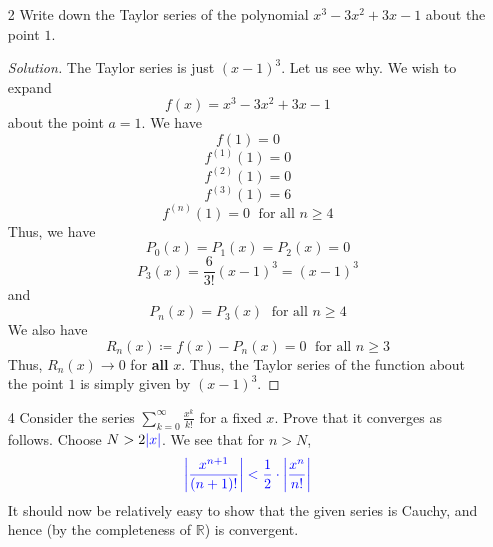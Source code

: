 \documentclass[12pt]{article}
\def\D{\mathrm{d}}
\def\ddfrac#1#2{\displaystyle\frac{\displaystyle #1}{\displaystyle #2}}
\theoremstyle{definition}
\newenvironment{soln}{\begin{proof}[Solution]}{\end{proof}}
\begin{document}
\begin{enumerate}[leftmargin=*]
\begin{soln}
        The remainder term is then just the difference of the arctangent function at $x$ and its Taylor polynomial. More precisely, we have
        \[
            R_n(x) = \arctan(x) - \sum_{k=0}^{M} \frac{(-1)^k}{2k-1} x^{2k-1}
        \]
        with $M$ defined as previously. Let us now calculate the remainder term $R_{2n-1}(x)$ more explicitly. We have
        \[
            \arctan^{\prime} = \textcolor{cyan}{1 - x^2 + x^4 + \ldots + (-1)^{n-1} x^{2n-2}} + (-1)^n x^{2n} \left[1 - x^2 + x^4 - \ldots \right]
        \]
        \[
            \therefore \arctan^{\prime} = \textcolor{cyan}{1 - x^2 + x^4 + (-1)^{n-1} x^{2n-2}} + (-1)^{n} \frac{x^{2n}}{1+x^2}
        \]
        On integrating both sides from $0$ to $x$, the cyan-coloured term just becomes $T_{2n-1}(x)$. (Verify!) Thus, we have
        \[
            \arctan(x) = T_{2n-1}(x) + (-1)^n \int_{0}^{x} \frac{t^{2n}}{1+t^2} \, \D t
        \]
        Thus, 
        \[
            R_{2n-1}(x) = (-1)^n \int_{0}^{x} \frac{t^{2n}}{1+t^2} \, \D t
        \]
        and 
        \[
            R_{2n}(x) = R_{2n-1}(x)
        \]
    \end{soln}
    
    \newpage
    
    \item[2] Write down the Taylor series of the polynomial $x^3 - 3x^2 + 3x - 1$ about the point $1$.
    \begin{soln}
        The Taylor series is just $(x-1)^3$. Let us see why. We wish to expand 
        \[
            f(x) = x^3 - 3x^2 + 3x -1
        \]
        about the point $a=1$. We have
        \[
            f(1) = 0
        \]
        \[
            f^{(1)}(1) = 0
        \]
        \[
            f^{(2)}(1) = 0
        \]
        \[
            f^{(3)}(1) = 6
        \]
        \[
            f^{(n)}(1) = 0 \; \text{ for all } n \geq 4
        \]
        Thus, we have
        \[
            P_0(x) = P_1(x) = P_2(x) = 0
        \]
        \[
            P_3(x) = \frac{6}{3!} (x-1)^3 = (x-1)^3
        \]
        and
        \[
            P_n(x) = P_3(x) \; \text{ for all } n \geq 4
        \]
        We also have
        \[
            R_n(x) \coloneqq f(x) - P_n(x) = 0 \; \text{ for all } n \geq 3
        \]
        Thus, $R_n(x) \to 0$ for \textbf{all} $x$. Thus, the Taylor series of the function about the point $1$ is simply given by $(x-1)^3$.
    \end{soln}
    
    \item[4] Consider the series $\sum\limits_{k=0}^{\infty} \ddfrac{x^k}{k!}$ for a fixed $x$. Prove that it converges as follows. Choose $N > 2\textcolor{blue}{\abs{x}}$. We see that for $n > N$, 
    \[
        \textcolor{blue}{\abs{\frac{x^{n+1}}{(n+1)!}} < \frac{1}{2} \cdot \abs{\frac{x^n}{n!}}}
    \]
    It should now be relatively easy to show that the given series is Cauchy, and hence (by the completeness of $\mathbb{R}$) is convergent.
    

\end{enumerate}
\end{document}
